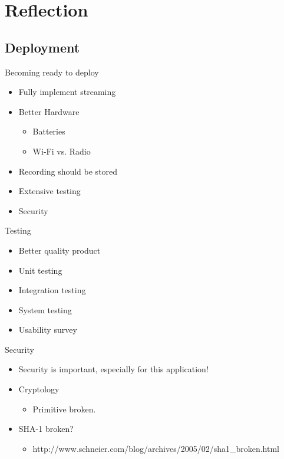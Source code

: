 

\author{Rasmus Steiniche}
\section{Reflection}

\subsection{Deployment}
\begin{frame}{Becoming ready to deploy}
\begin{itemize}
	\item Fully implement streaming
	\item Better Hardware
	\begin{itemize}
		\item Batteries
		\item Wi-Fi vs. Radio
	\end{itemize}
	\item Recording should be stored
	\item Extensive testing
	\item Security
\end{itemize}
\end{frame}

\begin{frame}{Testing}
\begin{itemize}
	\item Better quality product
	\item Unit testing
	\item Integration testing
	\item System testing
	\item Usability survey
\end{itemize}
\end{frame}

\begin{frame}{Security}
\begin{itemize}
	\item Security is important, especially for this application!
	\item Cryptology
	\begin{itemize}
		\item Primitive broken.
	\end{itemize}
	\item SHA-1 broken?
	\begin{itemize}
		\item \tiny{http://www.schneier.com/blog/archives/2005/02/sha1\_broken.html}
	\end{itemize}
\end{itemize}
\end{frame}

